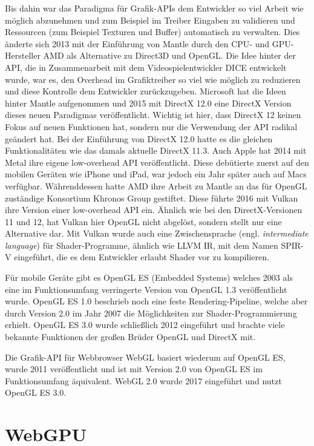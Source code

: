 \documentclass[oneside]{ausarbeitung}
\newcommand*{\quotize}[1]{\glqq #1\grqq}
\begin{document}
Bis dahin war das Paradigma für Grafik-APIs dem Entwickler so viel Arbeit wie möglich abzunehmen und zum Beispiel im Treiber Eingaben zu validieren und Ressourcen (zum Beispiel Texturen und Buffer) automatisch zu verwalten. Dies änderte sich 2013 mit der Einführung von Mantle durch den \ac{CPU}- und \ac{GPU}- Hersteller \ac{AMD} als Alternative zu Direct3D und OpenGL. Die Idee hinter der API, die in Zusammenarbeit mit dem Videospielentwickler DICE entwickelt wurde, war es, den Overhead im Grafiktreiber so viel wie möglich zu reduzieren und diese Kontrolle dem Entwickler zurückzugeben. Microsoft hat die Ideen hinter Mantle aufgenommen und 2015 mit DirectX 12.0 eine DirectX Version dieses neuen Paradigmas veröffentlicht. Wichtig ist hier, dass DirectX 12 keinen Fokus auf neuen Funktionen hat, sondern nur die Verwendung der API radikal geändert hat. Bei der Einführung von DirectX 12.0 hatte es die gleichen Funktionalitäten wie das damals aktuelle DirectX 11.3. Auch Apple hat 2014 mit Metal ihre eigene \quotize{low-overhead} API veröffentlicht. Diese debütierte zuerst auf den mobilen Geräten wie iPhone und iPad, war jedoch ein Jahr später auch auf Macs verfügbar. Währenddessen hatte AMD ihre Arbeit zu Mantle an das für OpenGL zuständige Konsortium Khronos Group gestiftet. Diese führte 2016 mit Vulkan ihre Version einer \quotize{low-overhead} API ein. Ähnlich wie bei den DirectX-Versionen 11 und 12, hat Vulkan hier OpenGL nicht abgelöst, sondern stellt nur eine Alternative dar. Mit Vulkan wurde auch eine Zwischensprache (engl. \textit{intermediate language}) für Shader-Programme, ähnlich wie LLVM IR, mit dem Namen SPIR-V eingeführt, die es dem Entwickler erlaubt Shader vor zu kompilieren.

Für mobile Geräte gibt es OpenGL ES (\quotize{Embedded Systems}) welches 2003 als eine im Funktionsumfang verringerte Version von OpenGL 1.3 veröffentlicht wurde. OpenGL ES 1.0 beschrieb noch eine feste Rendering-Pipeline, welche aber durch Version 2.0 im Jahr 2007 die Möglichkeiten zur Shader-Programmierung erhielt. OpenGL ES 3.0 wurde schließlich 2012 eingeführt und brachte viele bekannte Funktionen der \quotize{großen Brüder} OpenGL und DirectX mit.

Die Grafik-API für Webbrowser WebGL basiert wiederum auf OpenGL ES, wurde 2011 veröffentlicht und ist mit Version 2.0 von OpenGL ES im Funktionsumfang äquivalent. WebGL 2.0 wurde 2017 eingeführt und nutzt OpenGL ES 3.0.


\chapter{WebGPU}
\label{cha:webgpu}
\end{document}
